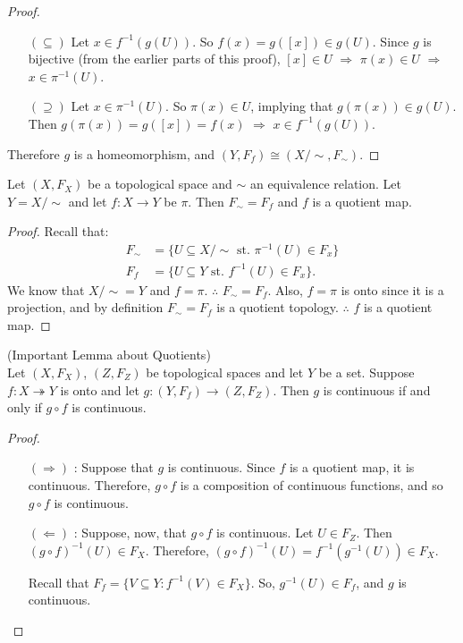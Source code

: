 \begin{proof}
\begin{itemize}
		\begin{itemize}
			\item[$(\subseteq)$] Let $x \in f^{-1}(g(U))$. So $f(x)=g([x]) \in g(U)$. Since $g$ is bijective (from the earlier parts of this proof), $[x] \in U$ $\Rightarrow$ $\pi(x) \in U$ $\Rightarrow$ $x \in \pi^{-1}(U)$. 
			\item[$(\supseteq)$] Let $x \in \pi^{-1}(U)$. So $\pi(x) \in U$, implying that $g(\pi(x)) \in g(U)$. Then $g(\pi(x)) = g([x]) = f(x)$ $\Rightarrow$ $x \in f^{-1}(g(U))$. 
		\end{itemize}
	\end{itemize}
	Therefore $g$ is a homeomorphism, and $(Y,F_f) \cong (X/\!\sim,F_\sim)$. 
\end{proof}
\begin{theorem}
	Let $(X,F_X)$ be a topological space and $\sim$ an equivalence relation. Let $Y = X/\!\sim$ and let $f : X \rightarrow Y$ be $\pi$. Then $F_\sim = F_f$ and $f$ is a quotient map. 
\end{theorem}
\begin{proof}
	Recall that: 
	\begin{align*}
		F_\sim &= \{ U \subseteq X/\!\sim \text{ st. } \pi^{-1} (U) \in F_x \} \\
		F_f &= \{ U \subseteq Y \text{ st. } f^{-1} (U) \in F_x \}. 
	\end{align*}
	We know that $X/\!\sim = Y$ and $f = \pi$. $\therefore$ $F_\sim = F_f$. Also, $f = \pi$ is onto since it is a projection, and by definition $F_\sim = F_f$ is a quotient topology. $\therefore$ $f$ is a quotient map. 
\end{proof}
\begin{lemma}
	(Important Lemma about Quotients)\\
	Let $(X,F_X)$, $(Z,F_Z)$ be topological spaces and let $Y$ be a set. Suppose $f: X \twoheadrightarrow Y$ is onto and let $g: (Y,F_f) \rightarrow (Z,F_Z)$. Then $g$ is continuous if and only if $g \circ f$ is continuous. 
\end{lemma}
\begin{proof}
	\begin{itemize}
		\item[$(\Rightarrow)$]: Suppose that $g$ is continuous. Since $f$ is a quotient map, it is continuous. Therefore, $g\circ f$ is a composition of continuous functions, and so $g\circ f$ is continuous.
		
		\item[$(\Leftarrow)$]: Suppose, now, that $g\circ f$ is continuous. Let $U\in F_Z$. Then $(g\circ f)^{-1}(U)\in F_X$. Therefore, $(g\circ f)^{-1}(U) = f^{-1}(g^{-1}(U)) \in F_X$.
		
		Recall that $F_f = \{ V\subseteq Y : f^{-1}(V)\in F_X\}$. So, $g^{-1}(U) \in F_f$, and $g$ is continuous. 
	\end{itemize}
\end{proof}
